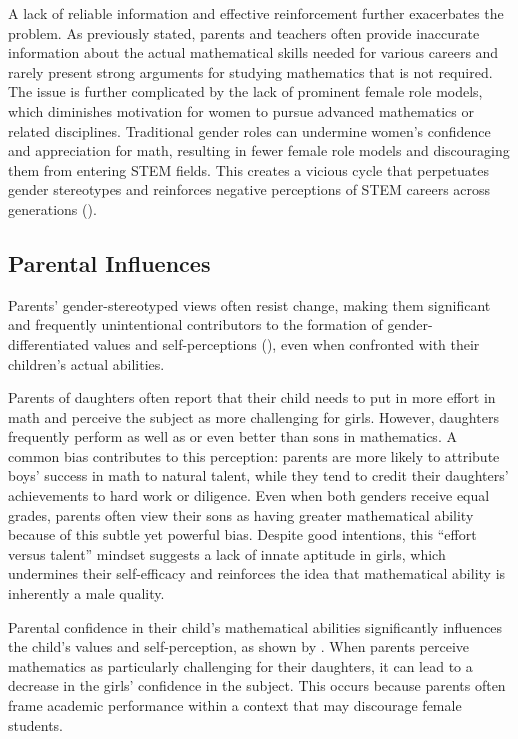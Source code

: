 A lack of reliable information and effective reinforcement further exacerbates the problem. As previously stated, parents and teachers often provide inaccurate information about the actual mathematical skills needed for various careers and rarely present strong arguments for studying mathematics that is not required. The issue is further complicated by the lack of prominent female role models, which diminishes motivation for women to pursue advanced mathematics or related disciplines. Traditional gender roles can undermine women's confidence and appreciation for math, resulting in fewer female role models and discouraging them from entering STEM fields. This creates a vicious cycle that perpetuates gender stereotypes and reinforces negative perceptions of STEM careers across generations (\cite{eccles1989}).
\subsection{Parental Influences}
Parents' gender-stereotyped views often resist change, making them significant and frequently unintentional contributors to the formation of gender-differentiated values and self-perceptions (\cite{Gunderson2012}), even when confronted with their children's actual abilities. 

Parents of daughters often report that their child needs to put in more effort in math and perceive the subject as more challenging for girls. However, daughters frequently perform as well as or even better than sons in mathematics. A common bias contributes to this perception: parents are more likely to attribute boys' success in math to natural talent, while they tend to credit their daughters' achievements to hard work or diligence. Even when both genders receive equal grades, parents often view their sons as having greater mathematical ability because of this subtle yet powerful bias. Despite good intentions, this ``effort versus talent'' mindset suggests a lack of innate aptitude in girls, which undermines their self-efficacy and reinforces the idea that mathematical ability is inherently a male quality.

Parental confidence in their child's mathematical abilities significantly influences the child's values and self-perception, as shown by \textcite{Jacobs1991}. When parents perceive mathematics as particularly challenging for their daughters, it can lead to a decrease in the girls' confidence in the subject. This occurs because parents often frame academic performance within a context that may discourage female students. 

